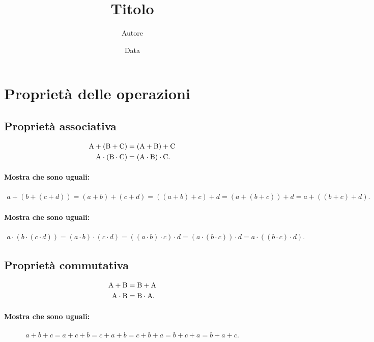 \documentclass{article}
\title{Titolo}
\author{Autore}
\date{Data}
\begin{document}
\section*{Proprietà delle operazioni}

\subsection*{Proprietà associativa}

\begin{align*}
{\rm A} + ({\rm B} + {\rm C}) &= ({\rm A} + {\rm B}) + {\rm C}\\
{\rm A} \cdot ({\rm B} \cdot {\rm C}) &= ({\rm A} \cdot {\rm B}) \cdot {\rm C}.
\end{align*}

\paragraph{Mostra che sono uguali:}

\begin{align*}
a + (b + (c + d)) = (a + b) + (c + d) = ((a + b) + c) + d = (a + (b + c)) + d = a + ((b + c) + d).
\end{align*}

\paragraph{Mostra che sono uguali:}

\begin{align*}
a \cdot (b \cdot (c \cdot d)) = (a \cdot b) \cdot (c \cdot d) = ((a \cdot b) \cdot c) \cdot d = (a \cdot (b \cdot c)) \cdot d = a \cdot ((b \cdot c) \cdot d).
\end{align*}

\subsection*{Proprietà commutativa}

\begin{align*}
{\rm A} + {\rm B} &= {\rm B} + {\rm A}\\
{\rm A} \cdot {\rm B} &= {\rm B} \cdot {\rm A}.
\end{align*}

\paragraph{Mostra che sono uguali:}

\begin{align*}
a + b + c = a + c + b = c + a + b = c + b + a = b + c + a = b + a + c.
\end{align*}
\end{document}
